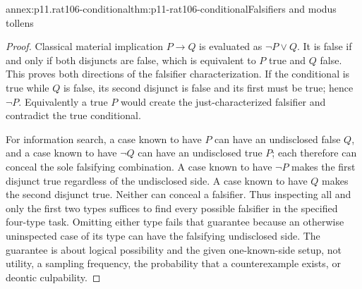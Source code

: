 \begin{annexitem}{annex:p11.rat106-conditional}{thm:p11-rat106-conditional}{Falsifiers and modus tollens}
\begin{proof}
Classical material implication \(P\to Q\) is evaluated as
\(\neg P\lor Q\). It is false if and only if both disjuncts
are false, which is equivalent to \(P\) true and \(Q\)
false. This proves both directions of the falsifier characterization.
If the conditional is true while \(Q\) is false, its second
disjunct is false and its first must be true; hence \(\neg P\).
Equivalently a true \(P\) would create the just-characterized
falsifier and contradict the true conditional.

For information search, a case known to have \(P\) can have
an undisclosed false \(Q\), and a case known to have
\(\neg Q\) can have an undisclosed true \(P\); each
therefore can conceal the sole falsifying combination. A case
known to have \(\neg P\) makes the first disjunct true
regardless of the undisclosed side. A case known to have
\(Q\) makes the second disjunct true. Neither can conceal a
falsifier. Thus inspecting all and only the first two types suffices
to find every possible falsifier in the specified four-type task.
Omitting either type fails that guarantee because an otherwise
uninspected case of its type can have the falsifying undisclosed
side. The guarantee is about logical possibility and the given
one-known-side setup, not utility, a sampling frequency, the
probability that a counterexample exists, or deontic culpability.
\end{proof}
\end{annexitem}

